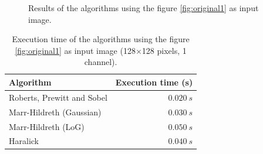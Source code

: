 \documentclass{ipol}
\numberwithin{equation}{section}
\numberwithin{table}{section}
\numberwithin{figure}{section}
\begin{document}
\begin{figure}[h!]
	\centering
	\quad
	\quad

	\quad
	\quad
	\caption{Results of the algorithms using the figure \ref{fig:original1} as input image.}
	\label{fig:result1}
\end{figure}

\begin{table}[t!]
	\begin{center}
	\begin{tabular}{| l | r |}
		\hline \rule{0pt}{3ex}
		\cellcolor[gray]{0.8} \textbf{Algorithm}	& \cellcolor[gray]{0.8} \textbf{Execution time (s)}	\\ \hline \rule{0pt}{3ex}
		Roberts, Prewitt and Sobel					& $0.020 \ s$										\\ \hline \rule{0pt}{3ex}
		Marr-Hildreth (Gaussian)					& $0.030 \ s$										\\ \hline \rule{0pt}{3ex}
		Marr-Hildreth (LoG)							& $0.050 \ s$										\\ \hline \rule{0pt}{3ex}
		Haralick									& $0.040 \ s$										\\
		\hline
	\end{tabular}
	\end{center}
	\caption{Execution time of the algorithms using the figure \ref{fig:original1} as input image (128$\times$128 pixels, 1 channel).}
	\label{exectime1}
\end{table}
\vspace{0.5cm}
\end{document}
